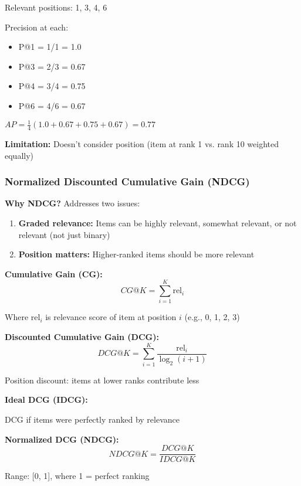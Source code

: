 \documentclass[11pt,letterpaper]{article}
\begin{document}
Relevant positions: 1, 3, 4, 6

Precision at each:
\begin{itemize}
    \item P@1 = 1/1 = 1.0
    \item P@3 = 2/3 = 0.67
    \item P@4 = 3/4 = 0.75
    \item P@6 = 4/6 = 0.67
\end{itemize}

$AP = \frac{1}{4}(1.0 + 0.67 + 0.75 + 0.67) = 0.77$

\textbf{Limitation:} Doesn't consider position (item at rank 1 vs. rank 10 weighted equally)

\subsubsection{Normalized Discounted Cumulative Gain (NDCG)}

\textbf{Why NDCG?} Addresses two issues:
\begin{enumerate}
    \item \textbf{Graded relevance:} Items can be highly relevant, somewhat relevant, or not relevant (not just binary)
    \item \textbf{Position matters:} Higher-ranked items should be more relevant
\end{enumerate}

\textbf{Cumulative Gain (CG):}
\begin{equation}
CG@K = \sum_{i=1}^{K} \text{rel}_i
\end{equation}

Where $\text{rel}_i$ is relevance score of item at position $i$ (e.g., 0, 1, 2, 3)

\textbf{Discounted Cumulative Gain (DCG):}
\begin{equation}
DCG@K = \sum_{i=1}^{K} \frac{\text{rel}_i}{\log_2(i + 1)}
\end{equation}

Position discount: items at lower ranks contribute less

\textbf{Ideal DCG (IDCG):}

DCG if items were perfectly ranked by relevance

\textbf{Normalized DCG (NDCG):}
\begin{equation}
NDCG@K = \frac{DCG@K}{IDCG@K}
\end{equation}

Range: [0, 1], where 1 = perfect ranking
\end{document}
